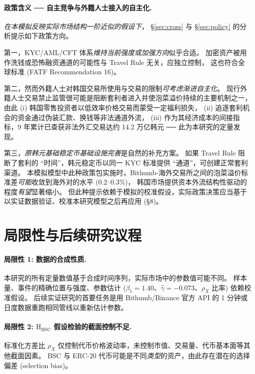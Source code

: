 \documentclass[11pt,a4paper]{article}
\begin{document}
\paragraph{政策含义 ── 自主竞争与外籍人士接入的自主化.}
\emph{在本模拟反映实际市场结构一阶近似的假设下}，
\S\ref{sec:cross} 与 \S\ref{sec:policy} 的分析提示如下政策方向。

第一，KYC/AML/CFT 体系\emph{维持当前强度或加强方向}似乎合适。
加密资产被用作洗钱或恐怖融资通道的可能性与 Travel Rule 无关，应独立控制，
这也符合全球标准 (FATF Recommendation 16)。

第二，然而外籍人士对韩国交易所使用与交易的限制\emph{可考虑渐进自主化}。
现行外籍人士交易禁止监管很可能是阻断套利者进入并使泡菜溢价持续的主要机制之一，
由此 (i) 韩国零售投资者以低效率价格交易而蒙受一定福利损失，
(ii) 追逐套利机会的资金通过伪装汇款、换钱等非法通道外流，
(iii) 作为其经济成本的间接指标，9 年累计已查获非法外汇交易达约 14.2 万亿韩元 ── 此为本研究的定量发现。

第三，\emph{原韩元基础稳定币基础设施完善}是自然的补充方案。
如果 Travel Rule 阻断了套利的 ``时间''，韩元稳定币以同一 KYC 标准提供 ``通道''，可创建正常套利渠道。
本模拟模型中此种政策包实施时，Bithumb-海外交易所之间的泡菜溢价标准差\emph{可能}收敛到海外对的水平 (0.2--0.3\%)，
韩国市场提供资本外流结构性驱动的程度\emph{有望}显著缩小。
但此种提示依赖于模拟的校准假设，实际政策决策应当基于以实证数据验证、校准本研究模型之后再应用 (\S 8)。

\section{局限性与后续研究议程}

\paragraph{局限性 1: 数据的合成性质.}
本研究的所有定量数值基于合成时间序列，实际市场中的参数值可能不同。
样本量、事件的精确位置与强度、参数估计 ($\beta_1=1.40$、$\hat\gamma=-0.073$、$\rho_X$ 比率) 依赖校准假设。
后续实证研究的首要任务是用 Bithumb/Binance 官方 API 的 1 分钟或日度数据重跑相同管线以重新估计参数。

\paragraph{局限性 2: $\mathrm{H_{BSC}}$ 假设检验的截面控制不足.}
标准化方差比 $\rho_X$ 仅控制代币价格波动率，未控制市值、交易量、代币基本面等其他截面因素。
BSC 与 ERC-20 代币可能是不同\emph{类型}的资产，由此存在潜在的选择偏差 (selection bias)。
\end{document}
